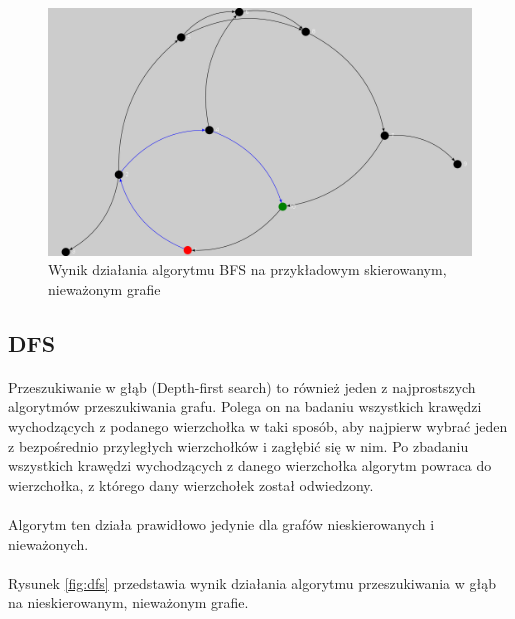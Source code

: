 \begin{figure}[!h]
 \centering
 \includegraphics[width=1.0\textwidth]{algorithms/bfs}
 \caption{Wynik działania algorytmu BFS na przykładowym skierowanym, nieważonym grafie}
 \label{fig:bfs}
\end{figure}

\subsection{DFS}
\paragraph{}
Przeszukiwanie w głąb (Depth-first search) to również jeden z najprostszych algorytmów przeszukiwania grafu. 
Polega on na badaniu wszystkich krawędzi wychodzących z podanego wierzchołka w taki sposób, aby najpierw wybrać jeden z bezpośrednio przyległych
wierzchołków i zagłębić się w nim.
Po zbadaniu wszystkich krawędzi wychodzących z danego wierzchołka algorytm powraca do wierzchołka, z którego dany wierzchołek został odwiedzony.
\paragraph{}
Algorytm ten działa prawidłowo jedynie dla grafów nieskierowanych i nieważonych.

\paragraph{}
Rysunek \ref{fig:dfs} przedstawia wynik działania algorytmu przeszukiwania w głąb na nieskierowanym, nieważonym grafie.

